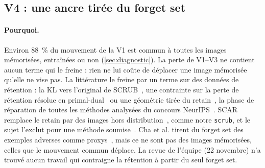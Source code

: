 \documentclass[11pt,a4paper]{article}
\newcommand{\code}[1]{\texttt{#1}}
\begin{document}
\subsection{V4 : une ancre tirée du forget set}\label{sec:trustv4}
\paragraph{Pourquoi.} Environ \SI{88}{\percent} du mouvement de la V1 est commun à toutes les images
mémorisées, entraînées ou non (\cref{sec:diagnostic}). La perte de V1--V3 ne contient aucun terme
qui le freine : rien ne lui coûte de déplacer une image mémorisée qu'elle ne vise pas. La
littérature le freine par un terme sur des données de rétention : la KL vers l'original de
SCRUB~\cite{kurmanji2023}, une contrainte sur la perte de rétention résolue en
primal-dual~\cite{entesari2025constrained} ou une géométrie tirée du retain~\cite{huang2024unified},
la phase de réparation de toutes les méthodes analysées du concours NeurIPS~\cite{triantafillou2024}.
SCAR remplace le retain par des images hors distribution~\cite{bonato2024scar}, comme notre
\code{scrub}, et le sujet l'exclut pour une méthode soumise~\cite{sujet2026}. Cha et al. tirent du
forget set des exemples adverses comme proxys~\cite{cha2024learning}, mais ce ne sont pas des images
mémorisées, celles que le mouvement commun déplace. La revue de l'équipe (22 novembre) n'a trouvé
aucun travail qui contraigne la rétention à partir du seul forget set.
\end{document}
